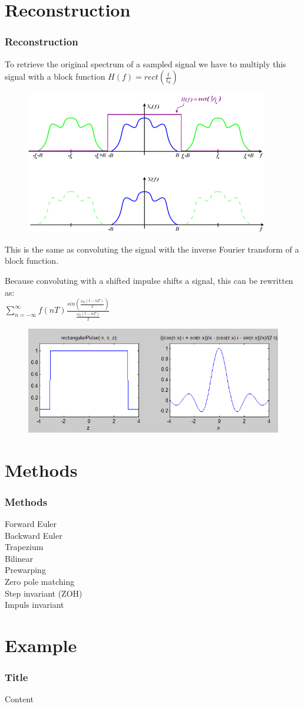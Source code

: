 \section{Reconstruction}

\begin{frame}
	\frametitle{Reconstruction}
	To retrieve the original spectrum of a sampled signal we have to multiply this signal with a block function $H(f) = rect(\frac{t}{t_0})$\\
	\begin{figure}
		\includegraphics[width=0.6\linewidth]{reconstruct1}
	\end{figure}
	This is the same as convoluting the signal with the inverse Fourier transform of a block function.
\end{frame}

\begin{frame}
	Because convoluting with a shifted impulse shifts a signal, this can be rewritten as:\\
	\medskip
	$\sum_{n=-\infty}^{\infty} f(nT) \frac{sin(\frac{\omega_0(t-nT)}{2})}{\frac{\omega_0(t-nT)}{2}}$\\
	\medskip
	\begin{figure}
		\includegraphics[width=0.8\linewidth]{reconstruct2}
	\end{figure}
\end{frame}

\section{Methods}

\begin{frame}
	\frametitle{Methods}
	Forward Euler\\
	Backward Euler\\
	Trapezium\\
	Bilinear\\
	Prewarping\\
	Zero pole matching\\
	Step invariant (ZOH)\\
	Impuls invariant
\end{frame}

\section{Example}

\begin{frame}
	\frametitle{Title}
	Content
\end{frame}
